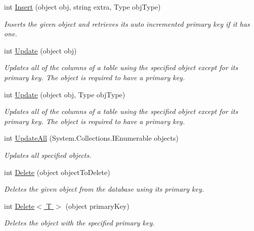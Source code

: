 \begin{DoxyCompactItemize}
int \hyperlink{classSQLite_1_1SQLiteConnection_ab88782cd2d5c77bb14d6a17baf7c49bc}{Insert} (object obj, string extra, Type obj\-Type)
\begin{DoxyCompactList}\small\item\em Inserts the given object and retrieves its auto incremented primary key if it has one. \end{DoxyCompactList}\item 
int \hyperlink{classSQLite_1_1SQLiteConnection_ae4effee772569a47256bcb5f8764eabc}{Update} (object obj)
\begin{DoxyCompactList}\small\item\em Updates all of the columns of a table using the specified object except for its primary key. The object is required to have a primary key. \end{DoxyCompactList}\item 
int \hyperlink{classSQLite_1_1SQLiteConnection_ab474a534faebfec1288672ef4e4f2140}{Update} (object obj, Type obj\-Type)
\begin{DoxyCompactList}\small\item\em Updates all of the columns of a table using the specified object except for its primary key. The object is required to have a primary key. \end{DoxyCompactList}\item 
int \hyperlink{classSQLite_1_1SQLiteConnection_a1a95399fe5d61f8bbb56e36eac38d467}{Update\-All} (System.\-Collections.\-I\-Enumerable objects)
\begin{DoxyCompactList}\small\item\em Updates all specified objects. \end{DoxyCompactList}\item 
int \hyperlink{classSQLite_1_1SQLiteConnection_a55234164e36bc4abcb086e197f25e436}{Delete} (object object\-To\-Delete)
\begin{DoxyCompactList}\small\item\em Deletes the given object from the database using its primary key. \end{DoxyCompactList}\item 
int \hyperlink{classSQLite_1_1SQLiteConnection_a0d4046198236b8c96b0bf50593f592a6}{Delete$<$ T $>$} (object primary\-Key)
\begin{DoxyCompactList}\small\item\em Deletes the object with the specified primary key. \end{DoxyCompactList}\item 

\end{DoxyCompactItemize}
